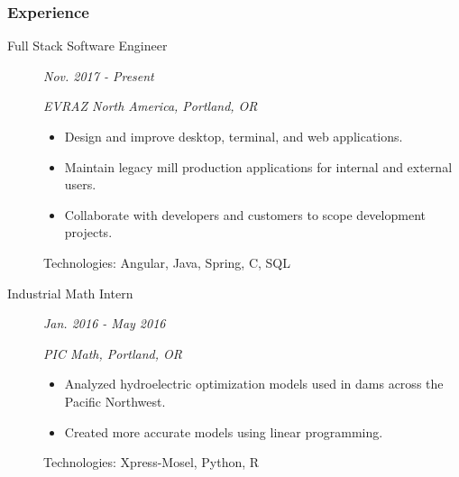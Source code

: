 \documentclass{article}
\begin{document}

\subsubsection*{Experience}

    \begin{description}
		
		\item[Full Stack Software Engineer] \hfill \textit{Nov. 2017 - Present}
		
        \textit{EVRAZ North America, Portland, OR}
        \begin{itemize}     
            \item Design and improve desktop, terminal, and web applications.
            \item Maintain legacy mill production applications for internal and external users.
            \item Collaborate with developers and customers to scope development projects.
        \end{itemize}
        Technologies: Angular, Java, Spring, C, SQL
		\vspace{0.5em}
		
        \item[Industrial Math Intern] \hfill \textit{Jan. 2016 - May 2016}
        
        \textit{PIC Math, Portland, OR}
        \begin{itemize}
            \item Analyzed hydroelectric optimization models used in dams across the Pacific Northwest.
            \item Created more accurate models using linear programming.
        \end{itemize}
        Technologies: Xpress-Mosel, Python, R

        
    \end{description}
    
\end{document}
